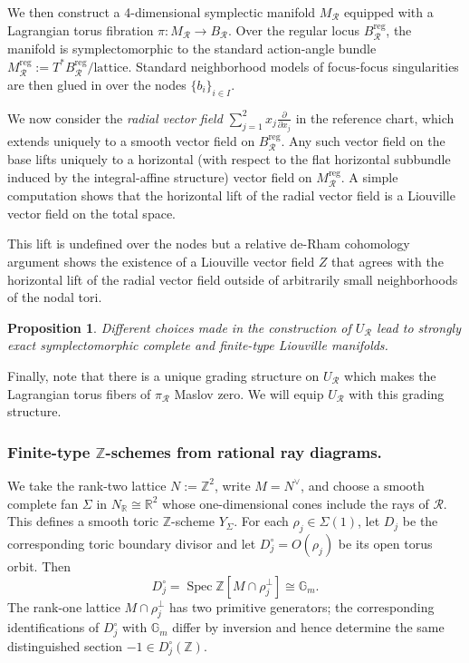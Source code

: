 \documentclass[11pt, reqno]{amsart}
\newtheorem{proposition}[theorem]{Proposition}
\theoremstyle{definition}
\begin{document}
We then construct a 4-dimensional symplectic manifold $M_{\mathcal{R}}$ equipped with a Lagrangian torus fibration $\pi: M_{\mathcal{R}} \to B_{\mathcal{R}}$. Over the regular locus $B_{\mathcal{R}}^{\text{reg}}$, the manifold is symplectomorphic to the standard action-angle bundle $M_{\mathcal{R}}^{\text{reg}}:=T^*B_{\mathcal{R}}^{\text{reg}} / \text{lattice}$. Standard neighborhood models of focus-focus singularities are then glued in over the nodes $\{b_i\}_{i \in I}$.

We now consider the \emph{radial vector field} $\sum_{j=1}^2 x_j \frac{\partial}{\partial x_j}$ in the reference chart, which extends uniquely to a smooth vector field on $B_{\mathcal{R}}^{\text{reg}}$. Any such vector field on the base lifts uniquely to a horizontal (with respect to the flat horizontal subbundle induced by the integral-affine structure) vector field on $M_{\mathcal{R}}^{\text{reg}}$. A simple computation shows that the horizontal lift of the radial vector field is a Liouville vector field on the total space.

This lift is undefined over the nodes but a relative de-Rham cohomology argument shows the existence of a Liouville vector field $Z$ that agrees with the horizontal lift of the radial vector field outside of arbitrarily small neighborhoods of the nodal tori. 



\begin{proposition}\label{prop-R-Liouville-eq}
    Different choices made in the construction of $U_\mathcal{R}$ lead to strongly exact symplectomorphic complete and finite-type Liouville manifolds. 
\end{proposition}

Finally, note that there is a unique grading structure on $U_\mathcal{R}$ which makes the Lagrangian torus fibers of $\pi_\mathcal{R}$ Maslov zero. We will equip $U_\mathcal{R}$ with this grading structure.


\subsubsection{Finite-type $\mathbb{Z}$-schemes from rational ray diagrams.}

We take the rank-two lattice $N:=\mathbb Z^2$, write $M=N^\vee$,
and choose a smooth complete fan $\Sigma$ in
$N_{\mathbb R}\cong\mathbb R^2$ whose one-dimensional cones include
the rays of $\mathcal R$. This defines a smooth toric
$\mathbb Z$-scheme $Y_\Sigma$. For each $\rho_j\in\Sigma(1)$, let
$D_j$ be the corresponding toric boundary divisor and let
$D_j^\circ=O(\rho_j)$ be its open torus orbit. Then
\[
D_j^\circ
=
\operatorname{Spec}\mathbb Z[M\cap\rho_j^\perp]
\cong\mathbb G_m.
\]
The rank-one lattice $M\cap\rho_j^\perp$ has two primitive generators;
the corresponding identifications of $D_j^\circ$ with $\mathbb G_m$
differ by inversion and hence determine the same distinguished section
$-1\in D_j^\circ(\mathbb Z)$.
\end{document}
